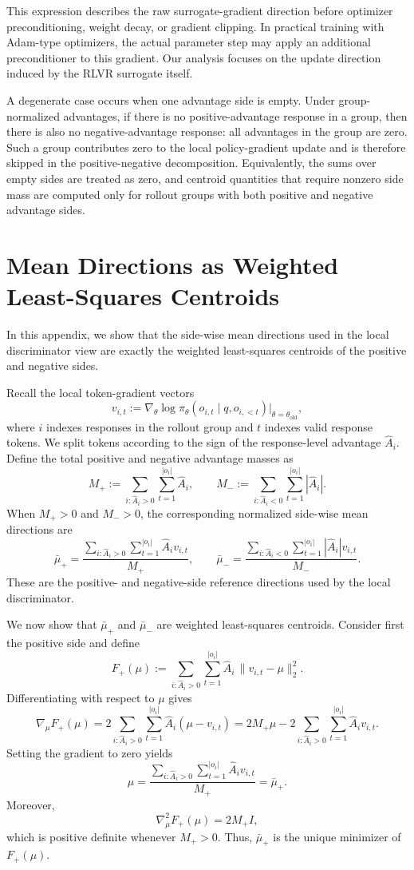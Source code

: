\documentclass{llmxive}
\begin{document}
This expression describes the raw surrogate-gradient direction before optimizer
preconditioning, weight decay, or gradient clipping. In practical training with
Adam-type optimizers, the actual parameter step may apply an additional
preconditioner to this gradient. Our analysis focuses on the update direction
induced by the RLVR surrogate itself.

A degenerate case occurs when one advantage side is empty. Under group-normalized advantages, if there is no positive-advantage response in a group, then there is also no negative-advantage response: all advantages in the group are zero. Such a group contributes zero to the local policy-gradient update and is therefore skipped in the positive-negative decomposition. Equivalently, the sums over empty sides are treated as zero, and centroid quantities that require nonzero side mass are computed only for rollout groups with both positive and negative advantage sides.

\section{Mean Directions as Weighted Least-Squares Centroids}
\label{app:l2-centroid}

In this appendix, we show that the side-wise mean directions used in the
local discriminator view are exactly the weighted least-squares centroids
of the positive and negative sides.

Recall the local token-gradient vectors
\[
v_{i,t}
:=
\nabla_\theta
\log \pi_\theta(o_{i,t}\mid q,o_{i,<t})
\Big|_{\theta=\theta_{\mathrm{old}}},
\]
where \(i\) indexes responses in the rollout group and \(t\) indexes valid
response tokens. We split tokens according to the sign of the response-level
advantage \(\hat A_i\). Define the total positive and negative advantage masses as
\[
M_+
:=
\sum_{i:\hat A_i>0}\sum_{t=1}^{|o_i|}
\hat A_i,
\qquad
M_-
:=
\sum_{i:\hat A_i<0}\sum_{t=1}^{|o_i|}
|\hat A_i|.
\]
When \(M_+>0\) and \(M_->0\), the corresponding normalized side-wise mean
directions are
\[
\bar\mu_+
=
\frac{
\sum_{i:\hat A_i>0}\sum_{t=1}^{|o_i|}
\hat A_i v_{i,t}
}{
M_+
},
\qquad
\bar\mu_-
=
\frac{
\sum_{i:\hat A_i<0}\sum_{t=1}^{|o_i|}
|\hat A_i| v_{i,t}
}{
M_-
}.
\]
These are the positive- and negative-side reference directions used by the
local discriminator.

We now show that \(\bar\mu_+\) and \(\bar\mu_-\) are weighted least-squares
centroids. Consider first the positive side and define
\[
F_+(\mu)
:=
\sum_{i:\hat A_i>0}\sum_{t=1}^{|o_i|}
\hat A_i\,\|v_{i,t}-\mu\|_2^2.
\]
Differentiating with respect to \(\mu\) gives
\[
\nabla_\mu F_+(\mu)
=
2\sum_{i:\hat A_i>0}\sum_{t=1}^{|o_i|}
\hat A_i(\mu-v_{i,t})
=
2M_+\mu
-
2\sum_{i:\hat A_i>0}\sum_{t=1}^{|o_i|}
\hat A_i v_{i,t}.
\]
Setting the gradient to zero yields
\[
\mu
=
\frac{
\sum_{i:\hat A_i>0}\sum_{t=1}^{|o_i|}
\hat A_i v_{i,t}
}{
M_+
}
=
\bar\mu_+.
\]
Moreover,
\[
\nabla_\mu^2 F_+(\mu)
=
2M_+ I,
\]
which is positive definite whenever \(M_+>0\). Thus, \(\bar\mu_+\) is the
unique minimizer of \(F_+(\mu)\).
\end{document}
